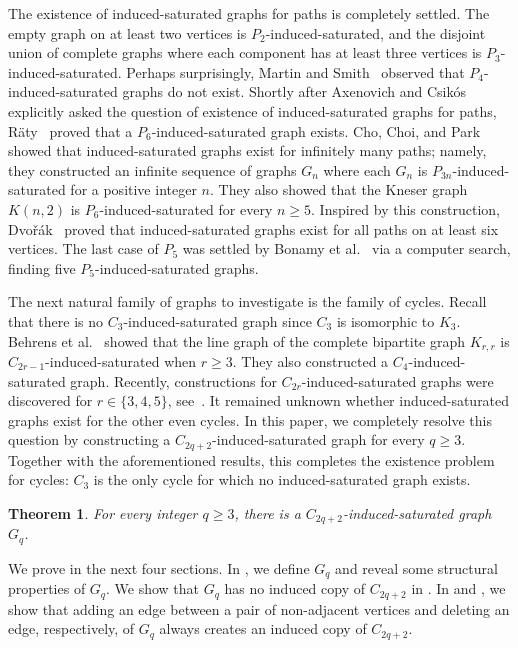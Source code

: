 \documentclass[11pt]{article}
\newtheorem{theorem}{Theorem}[section]
\theoremstyle{definition}
\theoremstyle{remark}
\begin{document}
The existence of induced-saturated graphs for paths is completely settled. 
The empty graph on at least two vertices is $P_2$-induced-saturated, and the disjoint union of complete graphs where each component has at least three vertices is $P_3$-induced-saturated. 
Perhaps surprisingly, Martin and Smith~\cite{2012MaSm} observed that $P_4$-induced-saturated graphs do not exist.
Shortly after Axenovich and Csik\'os~\cite{2019AxCs} explicitly asked the question of existence of induced-saturated graphs for paths, R\"{a}ty~\cite{2020Raty} proved that a $P_6$-induced-saturated graph exists. 
Cho, Choi, and Park~\cite{2021ChChPa} showed that induced-saturated graphs exist for infinitely many paths; namely, they constructed an infinite sequence of graphs $G_n$ where each $G_n$ is $P_{3n}$-induced-saturated for a positive integer $n$. 
They also showed that the Kneser graph $K(n, 2)$ is $P_6$-induced-saturated for every $n\geq 5$.
Inspired by this construction, Dvo\v{r}\'{a}k~\cite{2020Dvorak} proved that induced-saturated graphs exist for all paths on at least six vertices. 
The last case of $P_5$ was settled by Bonamy et al.~\cite{unpub_BoGrJoMoSc} via a computer search, finding five $P_5$-induced-saturated graphs.

The next natural family of graphs to investigate is the family of cycles. 
Recall that there is no $C_3$-induced-saturated graph since $C_3$ is isomorphic to $K_3$. 
Behrens et al.~\cite{2016BeErSaYaYe} showed that the line graph of the complete bipartite graph $K_{r,r}$ is $C_{2r-1}$-induced-saturated when $r\geq 3$. 
They also constructed a $C_4$-induced-saturated graph. 
Recently, constructions for $C_{2r}$-induced-saturated graphs were discovered for $r\in\{3,4,5\}$, see~\cite{arXiv_2025FaHaHaSp}.
It remained unknown whether induced-saturated graphs exist for the other even cycles.
In this paper, we completely resolve this question by constructing a $C_{2q+2}$-induced-saturated graph for every $q\geq 3$. 
Together with the aforementioned results, this completes the existence problem for cycles: $C_3$ is the only cycle for which no induced-saturated graph exists.

\begin{theorem}\label{thm:main}
For every integer $q\ge3$, there is a $C_{2q+2}$-induced-saturated graph $G_q$.
\end{theorem}


We prove  in the next four sections. 
In , we define $G_q$ and reveal some structural properties of $G_q$.
We show that $G_q$ has no induced copy of $C_{2q+2}$ in .
In  and , we show that adding an edge between a pair of non-adjacent vertices and deleting an edge, respectively, of $G_q$ always creates an induced copy of $C_{2q+2}$.
\end{document}
